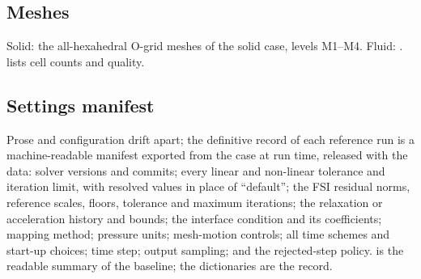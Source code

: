 \subsection{Meshes}
Solid: the all-hexahedral O-grid meshes of the solid case, levels M1--M4.
Fluid: .  lists cell counts and quality.

\begin{table}[t]
\centering
\caption{Mesh levels. Solid divisions: square side $\times$ ring $\times$
wall. M1$\to$M2 is not a uniform factor-2 refinement (3 and 5 cells through
the wall; effective 3-D ratio $(12800/1920)^{1/3}=1.88$); M2$\to$M3 and
M3$\to$M4 are.}
\label{tab:meshes}
\small
{}
\end{table}

\subsection{Settings manifest}\label{sec:methods:manifest}
Prose and configuration drift apart; the definitive record of each
reference run is a machine-readable manifest exported from the case at run
time, released with the data: solver versions and commits; every linear and
non-linear tolerance and iteration limit, with resolved values in place of
``default''; the FSI residual norms, reference scales, floors, tolerance and
maximum iterations; the relaxation or acceleration history and bounds; the
interface condition and its coefficients; mapping method; pressure units;
mesh-motion controls; all time schemes and start-up choices; time step;
output sampling; and the rejected-step policy.  is the
readable summary of the baseline; the dictionaries are the record.

